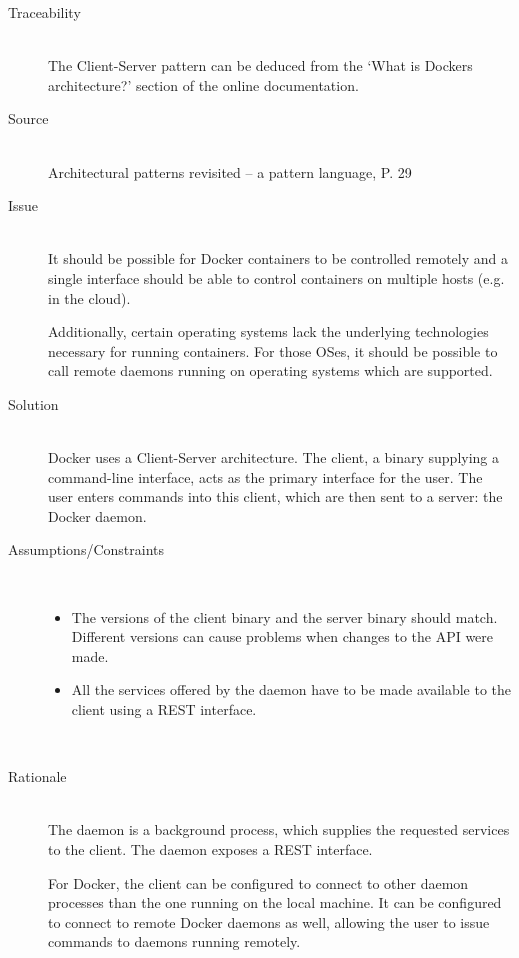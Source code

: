 \begin{description}
\item [Traceability]~\\
The Client-Server pattern can be deduced from the `What is Dockers architecture?' section of the online documentation\cite{dockerarchi}.

\item [Source]~\\
Architectural patterns revisited -- a pattern language, P. 29 \cite{avgeriou2005architectural}

\item [Issue]~\\
It should be possible for Docker containers to be controlled remotely and a single interface should be able to control containers on multiple hosts (e.g. in the cloud).

Additionally, certain operating systems lack the underlying technologies necessary for running containers. For those OSes, it should be possible to call remote daemons running on operating systems which are supported. %

\item [Solution]~\\
Docker uses a {Client-Server} architecture. The client, a binary supplying a command-line interface, acts as the primary interface for the user. The user enters commands into this client, which are then sent to a server: the Docker daemon. 


\item [Assumptions/Constraints]~
\begin{itemize}
\item The versions of the client binary and the server binary should match. Different versions can cause problems when changes to the API were made.
\item All the services offered by the daemon have to be made available to the client using a REST interface.
\end{itemize}
~\\[-1.7cm]
\item [Rationale] ~\\
The daemon is a background process, which supplies the requested services to the client. The daemon exposes a REST interface.

For Docker, the client can be configured to connect to other daemon processes than the one running on the local machine. It can be configured to connect to remote Docker daemons as well, allowing the user to issue commands to daemons running remotely.


\end{description}
